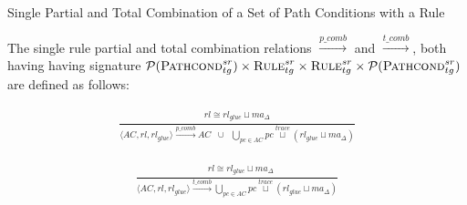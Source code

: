 \begin{definition}{Single Partial and Total Combination of a Set of Path Conditions with a Rule\\}
\label{def:comb_path_cond_rule_single}
% 
% 
%





The single rule partial and total combination relations $\stackrel{p\_comb}{\rightarrow}$ and $\stackrel{t\_comb}{\rightarrow}$, both having having signature $\mathcal{P}(\textsc{Pathcond}^{sr}_{tg}) \times \textsc{Rule}^{sr}_{tg} \times \textsc{Rule}^{sr}_{tg} \times \mathcal{P}(\textsc{Pathcond}^{sr}_{tg})$ are defined as follows:


\begin{align}
\label{eq:pcomb}
\frac{\begin{array}{ll}
rl\cong rl_{glue}\sqcup ma_{\Delta}
\end{array}}
{\langle AC,rl,rl_{glue}\rangle \xrightarrow{p\_comb} AC\;\;\cup\;\; \bigcup_{pc\in AC} pc\stackrel{trace}{\sqcup} (rl_{glue} \sqcup ma_{\Delta})}
\end{align}


\begin{align}
\label{eq:tcomb}
\frac{\begin{array}{ll}&
rl\cong rl_{glue}\sqcup ma_{\Delta}
\end{array}}
{\langle AC,rl,rl_{glue}\rangle \xrightarrow{t\_comb} \bigcup_{pc\in AC} pc\stackrel{trace}{\sqcup} (rl_{glue} \sqcup ma_{\Delta})}
\end{align}

\end{definition}


